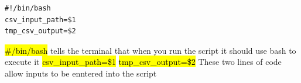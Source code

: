 \documentclass[]{article}
\begin{document}
\begin{tcolorbox}[colback=white, colframe=black, boxrule=0.5pt, arc=2mm, 
    title=First part of the code, fonttitle=\bfseries, listing only, listing options={language=sh, basicstyle=\ttfamily}]

    \begin{verbatim}
#!/bin/bash
csv_input_path=$1
tmp_csv_output=$2
    \end{verbatim}
\hl{\#\!/bin/bash}\newline
tells the terminal that when you run the script it should use bash to execute it\newline
\hl{csv\_input\_path=\$1}\newline
\hl{tmp\_csv\_output=\$2}\newline
These two lines of code allow inputs to be enntered into the script
\end{tcolorbox}
\end{document}
